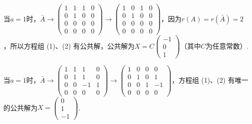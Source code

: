 \begin{enumerate}
          当$a=1$时，$\bar{A}\rightarrow\begin{pmatrix}
                  1 & 1 & 1 & 0 \\
                  0 & 1 & 0 & 0 \\
                  0 & 0 & 0 & 0 \\
                  0 & 0 & 0 & 0
              \end{pmatrix}\rightarrow\begin{pmatrix}
                  1 & 0 & 1 & 0 \\
                  0 & 1 & 0 & 0 \\
                  0 & 0 & 0 & 0 \\
                  0 & 0 & 0 & 0
              \end{pmatrix}$，因为$r(A)=r(\bar{A})=2$，所以方程组 (1)、(2) 有公共解，公共解为$X=C\begin{pmatrix} -1 \\ 0  \\ 1 \end{pmatrix}$（其中$C$为任意常数）.

          当$a=1$时，$\bar{A}\rightarrow\begin{pmatrix}
                  1 & 1 & 1  & 0 \\
                  0 & 1 & 1  & 0 \\
                  0 & 0 & -1 & 1 \\
                  0 & 0 & 0  & 0
              \end{pmatrix}\rightarrow\begin{pmatrix}
                  1 & 0 & 0 & 0  \\
                  0 & 1 & 0 & 1  \\
                  0 & 0 & 1 & -1 \\
                  0 & 0 & 0 & 0
              \end{pmatrix}$，方程组 (1)、(2) 有唯一的公共解为$X=\begin{pmatrix}
                  0 \\
                  1 \\
                  -1
              \end{pmatrix}$.
\end{enumerate}

